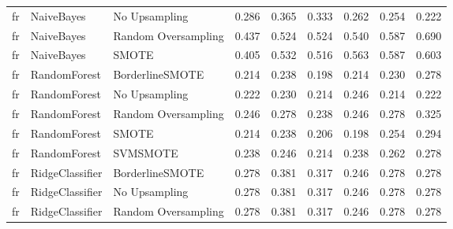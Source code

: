 \begin{tabular}{lllllllll}
      fr &                      NaiveBayes &                 No Upsampling & 0.286 &                     0.365 &                 0.333 &                  0.262 &                                   0.254 &     0.222 \\
      fr &                      NaiveBayes &           Random Oversampling & 0.437 &                     0.524 &                 0.524 &                  0.540 &                                   0.587 &     0.690 \\
      fr &                      NaiveBayes &                         SMOTE & 0.405 &                     0.532 &                 0.516 &                  0.563 &                                   0.587 &     0.603 \\
      fr &                    RandomForest &               BorderlineSMOTE & 0.214 &                     0.238 &                 0.198 &                  0.214 &                                   0.230 &     0.278 \\
      fr &                    RandomForest &                 No Upsampling & 0.222 &                     0.230 &                 0.214 &                  0.246 &                                   0.214 &     0.222 \\
      fr &                    RandomForest &           Random Oversampling & 0.246 &                     0.278 &                 0.238 &                  0.246 &                                   0.278 &     0.325 \\
      fr &                    RandomForest &                         SMOTE & 0.214 &                     0.238 &                 0.206 &                  0.198 &                                   0.254 &     0.294 \\
      fr &                    RandomForest &                      SVMSMOTE & 0.238 &                     0.246 &                 0.214 &                  0.238 &                                   0.262 &     0.278 \\
      fr &                 RidgeClassifier &               BorderlineSMOTE & 0.278 &                     0.381 &                 0.317 &                  0.246 &                                   0.278 &     0.278 \\
      fr &                 RidgeClassifier &                 No Upsampling & 0.278 &                     0.381 &                 0.317 &                  0.246 &                                   0.278 &     0.278 \\
      fr &                 RidgeClassifier &           Random Oversampling & 0.278 &                     0.381 &                 0.317 &                  0.246 &                                   0.278 &     0.278 \\

\end{tabular}
